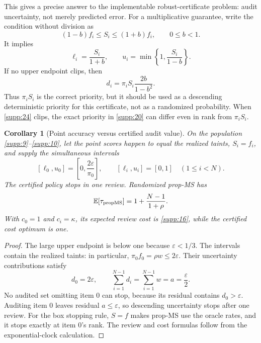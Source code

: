 \documentclass[11pt]{article}
\newtheorem{corollary}{Corollary}
\newcommand{\E}{\mathbb{E}}
\begin{document}
This gives a precise answer to the implementable robust-certificate problem:
audit uncertainty, not merely predicted error. For a multiplicative guarantee,
write the condition without division as
\begin{equation}\label{supp:23}
 (1-b)f_i\le S_i\le(1+b)f_i,\qquad 0\le b<1.
\end{equation}
It implies
\begin{equation}\label{supp:24}
 \ell_i=\frac{S_i}{1+b},\qquad
 u_i=\min\left\{1,\frac{S_i}{1-b}\right\}.
\end{equation}
If no upper endpoint clips, then
\begin{equation}\label{supp:25}
 d_i=\pi_i S_i\frac{2b}{1-b^2}.
\end{equation}
Thus \(\pi_iS_i\) is the correct priority, but it should be used as a
descending deterministic priority for this certificate, not as a randomized
probability. When \eqref{supp:24} clips, the exact priority in \eqref{supp:20} can differ even in
rank from \(\pi_iS_i\).

\begin{corollary}[Point accuracy versus certified audit value]
On the population \eqref{supp:9}--\eqref{supp:10}, let the point scores happen to equal the realized
taints, \(S_i=f_i\), and supply the simultaneous intervals
\begin{equation}\label{supp:26}
 [\ell_0,u_0]=\left[0,\frac{2\varepsilon}{\pi_0}\right],
 \qquad [\ell_i,u_i]=[0,1]\quad(1\le i<N).
\end{equation}
The certified policy stops in one review. Randomized prop-MS has
\[
 \E[\tau_{\rm propMS}]=1+\frac{N-1}{1+\rho}.
\]
With \(c_0=1\) and \(c_i=\kappa\), its expected review cost is \eqref{supp:16}, while the
certified cost optimum is one.
\end{corollary}

\begin{proof}
The large upper endpoint is below one because \(\varepsilon<1/3\). The
intervals contain the realized taints: in particular,
\(\pi_0f_0=\rho w\le2\varepsilon\). Their uncertainty contributions satisfy
\[
 d_0=2\varepsilon,
 \qquad \sum_{i=1}^{N-1}d_i=\sum_{i=1}^{N-1}w
 =a=\frac{\varepsilon}{2}.
\]
No audited set omitting item \(0\) can stop, because its residual contains
\(d_0>\varepsilon\). Auditing item \(0\) leaves residual
\(a\le\varepsilon\), so descending uncertainty stops after one review. For the box stopping rule, \(S=f\) makes prop-MS use the oracle rates,
and it stops exactly at item \(0\)'s rank.
The review and cost formulas follow from the exponential-clock calculation.
\end{proof}
\end{document}
